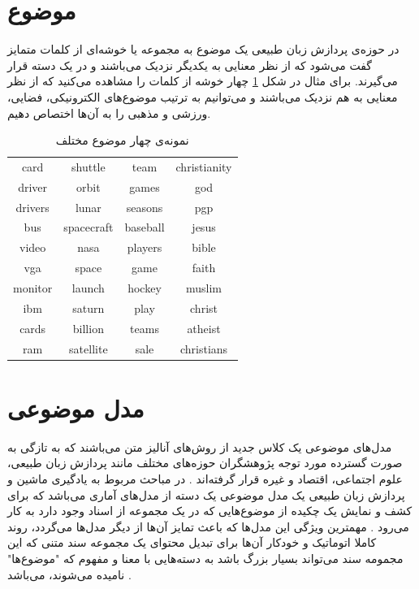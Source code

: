 \section{موضوع}
در حوزه‌ی پردازش زبان طبیعی یک موضوع به مجموعه یا خوشه‌ای
از کلمات متمایز گفت می‌‌شود که از نظر معنایی به یکدیگر نزدیک می‌‌باشند و در یک دسته قرار می‌‌گیرند. برای مثال در شکل
\ref{chap2-tb1}
چهار خوشه از کلمات را مشاهده می‌‌کنید که از نظر معنایی به هم نزدیک می‌‌باشند و می‌‌توانیم به ترتیب موضوع‌های الکترونیکی، فضایی، ورزشی و مذهبی را به آن‌ها اختصاص دهیم.
\begin{table}[!h]
	\centering
	\begin{latin}
	\begin{tabular}{|c|c|c|c|}
		\hline
		card 	 & shuttle 		& team 	   & christianity\\
		driver 	 & orbit 		& games    & god\\
		drivers  & lunar 		& seasons  & pgp\\ 
		bus		 & spacecraft 	& baseball & jesus\\ 
		video	 & nasa  		& players  & bible\\ 
		vga		 & space 		& game     & faith\\ 
		monitor  & launch 		& hockey   & muslim\\ 
		ibm   	 & saturn  		& play 	   & christ\\ 
		cards	 & billion		& teams    & atheist\\
		ram    	 & satellite	& sale     & christians\\
		\hline
	\end{tabular}
	\end{latin}
	\caption{نمونه‌ی چهار موضوع مختلف}
	\label{chap2-tb1}
\end{table}

\section{مدل‌ موضوعی}
\label{chap2sec12}
مدل‌های موضوعی یک کلاس جدید از روش‌های آنالیز متن
می‌‌باشند که به تازگی به صورت گسترده مورد توجه پژوهشگران حوزه‌های مختلف مانند پردازش زبان طبیعی، علوم اجتماعی، اقتصاد و  غیره قرار گرفته‌اند 
\cite{mohr2013introduction}\cite{blei2012probabilistic}.
  در مباحث مربوط به یادگیری ماشین و پردازش زبان طبیعی یک مدل موضوعی یک دسته از مدل‌های آماری می‌‌باشد که برای کشف و نمایش یک چکیده
  از موضوع‌هایی که در یک مجموعه از اسناد
   وجود دارد به کار می‌رود 
\cite{zheng2014topic}\cite{blei2003modeling}.
   مهمترین ویژگی این مدل‌ها که باعث تمایز آن‌ها از دیگر مدل‌ها می‌‌گردد، روند کاملا اتوماتیک و خودکار آن‌ها برای تبدیل محتوای یک مجموعه سند متنی که این مجمومه سند می‌‌تواند بسیار بزرگ باشد به دسته‌هایی با معنا و مفهوم که "موضوع‌ها" نامیده می‌‌شوند، می‌‌باشد
\cite{mohr2013introduction}.

